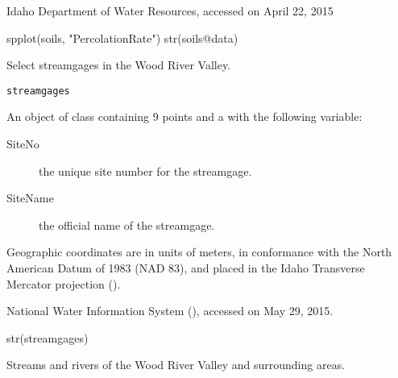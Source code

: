 \documentclass[a4paper]{book}
\begin{document}
%
\begin{Source}\relax
Idaho Department of Water Resources, accessed on April 22, 2015
\end{Source}
%
\begin{Examples}
\begin{ExampleCode}
spplot(soils, "PercolationRate")
str(soils@data)
\end{ExampleCode}
\end{Examples}
%
\begin{Description}\relax
Select streamgages in the Wood River Valley.
\end{Description}
%
\begin{Usage}
\begin{verbatim}
streamgages
\end{verbatim}
\end{Usage}
%
\begin{Format}
An object of  class containing 9 points and a  with the following variable:
\begin{description}

\item[SiteNo] the unique site number for the streamgage.
\item[SiteName] the official name of the streamgage.

\end{description}

Geographic coordinates are in units of meters, in conformance with the North American Datum of 1983 (NAD 83), and placed in the
Idaho Transverse Mercator projection ().
\end{Format}
%
\begin{Source}\relax
National Water Information System (), accessed on May 29, 2015.
\end{Source}
%
\begin{Examples}
\begin{ExampleCode}
str(streamgages)
\end{ExampleCode}
\end{Examples}
%
\begin{Description}\relax
Streams and rivers of the Wood River Valley and surrounding areas.
\end{Description}
\end{document}
